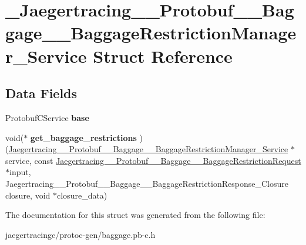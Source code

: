\hypertarget{struct__Jaegertracing____Protobuf____Baggage____BaggageRestrictionManager__Service}{}\section{\+\_\+\+Jaegertracing\+\_\+\+\_\+\+Protobuf\+\_\+\+\_\+\+Baggage\+\_\+\+\_\+\+Baggage\+Restriction\+Manager\+\_\+\+Service Struct Reference}
\label{struct__Jaegertracing____Protobuf____Baggage____BaggageRestrictionManager__Service}
\subsection*{Data Fields}
\begin{DoxyCompactItemize}
\item 
\mbox{\label{struct__Jaegertracing____Protobuf____Baggage____BaggageRestrictionManager__Service_af63416dcd79a1f4fe423d53d0888bae5}} 
Protobuf\+C\+Service {\bfseries base}
\item 
\mbox{\label{struct__Jaegertracing____Protobuf____Baggage____BaggageRestrictionManager__Service_a85aa2aec4d75c6151f6d694cf56859ab}} 
void($\ast$ {\bfseries get\+\_\+baggage\+\_\+restrictions} )(\mbox{\hyperlink{struct__Jaegertracing____Protobuf____Baggage____BaggageRestrictionManager__Service}{Jaegertracing\+\_\+\+\_\+\+Protobuf\+\_\+\+\_\+\+Baggage\+\_\+\+\_\+\+Baggage\+Restriction\+Manager\+\_\+\+Service}} $\ast$service, const \mbox{\hyperlink{struct__Jaegertracing____Protobuf____Baggage____BaggageRestrictionRequest}{Jaegertracing\+\_\+\+\_\+\+Protobuf\+\_\+\+\_\+\+Baggage\+\_\+\+\_\+\+Baggage\+Restriction\+Request}} $\ast$input, Jaegertracing\+\_\+\+\_\+\+Protobuf\+\_\+\+\_\+\+Baggage\+\_\+\+\_\+\+Baggage\+Restriction\+Response\+\_\+\+Closure closure, void $\ast$closure\+\_\+data)
\end{DoxyCompactItemize}


The documentation for this struct was generated from the following file\+:\begin{DoxyCompactItemize}
\item 
jaegertracingc/protoc-\/gen/baggage.\+pb-\/c.\+h\end{DoxyCompactItemize}
